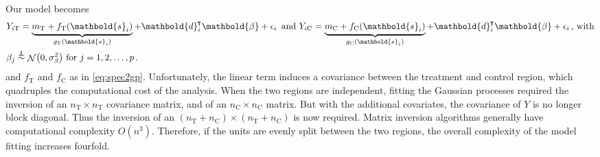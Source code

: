 \documentclass[letter,12pt]{article}
\DeclarePairedDelimiter{\parenthesis}{\lparen}{\rparen}
\newcommand{\del}[1]{\parenthesis*{#1}}
\DeclareMathOperator{\normal}{\mathcal{N}}
\newcommand*{\trans}{^{\mkern-1.5mu\intercal}}
\newcommand{\treat}{\mathrm{T}}
\newcommand{\ctrol}{\mathrm{C}}
\newcommand{\sigmabeta}{\sigma_{\beta}}
\newcommand{\svec}{\mathbold{s}}
\newcommand{\dvec}{\mathbold{d}}
\newcommand{\betavec}{\mathbold{\beta}}
\newcommand{\indep}{\protect\mathpalette{\protect\independenT}{\perp}}
\def\independenT#1#2{\mathrel{\rlap{$#1#2$}\mkern2mu{#1#2}}}
\begin{document}
Our model becomes
\begin{equation}
    \begin{split}
        & Y_{i\treat} = \underbrace{m_\treat{} + f_\treat{}(\svec_i)}_{g_\treat{}(\svec_i)} + \dvec_i\trans \betavec + \epsilon_i\,\text{ and }
        Y_{i\ctrol} = \underbrace{m_\ctrol{} + f_\ctrol{}(\svec_i)}_{g_\ctrol{}(\svec_i)} + \dvec_i\trans \betavec + \epsilon_i\,\text{, with} \\
        & \beta_j \overset{\indep}{\sim} \normal\del{0,\sigmabeta^2}\text{ for }j=1,2,\dotsc,p \,.
    \end{split}
    \label{eq:covariates_model}
\end{equation}
and \(f_\treat\) and \(f_\ctrol\) as in \eqref{eq:spec2gp}.
Unfortunately, the linear term induces a covariance between the treatment and control region, which quadruples the computational cost of the analysis.
When the two regions are independent, fitting the Gaussian processes required the inversion of an \(n_\treat{} \times n_\treat{}\) covariance matrix, and of an \(n_\ctrol{} \times n_\ctrol{}\) matrix.
But with the additional covariates, the covariance of \(Y\) is no longer block diagonal.
Thus the inversion of an \((n_\treat{}+n_\ctrol{}) \times (n_\treat{}+n_\ctrol{})\) is now required.
Matrix inversion algorithms generally have computational complexity \(O(n^3)\).
Therefore, if the units are evenly split between the two regions,
the overall complexity of the model fitting increases fourfold.
\end{document}
